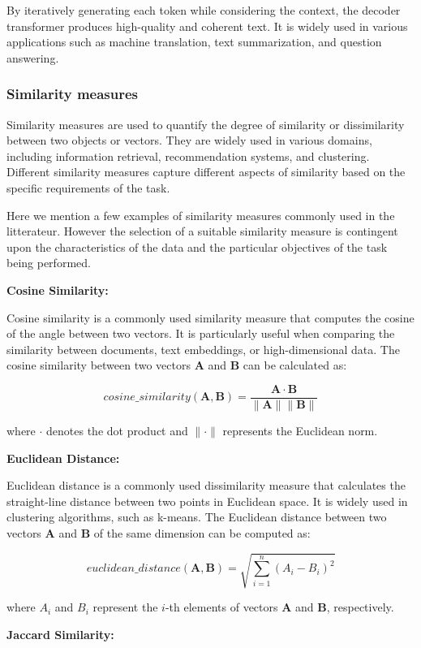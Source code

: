 \documentclass[a4paper,12pt]{article}
\begin{document}
By iteratively generating each token while considering the context, the decoder transformer produces high-quality and coherent text. 
It is widely used in various applications such as machine translation, text summarization, and question answering.

\subsubsection{Similarity measures}
Similarity measures are used to quantify the degree of similarity or dissimilarity between two objects or vectors. They are widely used in various domains, including information retrieval, recommendation systems, and clustering. Different similarity measures capture different aspects of similarity based on the specific requirements of the task.

Here we mention a few examples of similarity measures commonly used in the litterateur. However the selection of a suitable similarity measure is contingent upon the characteristics of the data and the particular objectives of the task being performed.


\textbf{Cosine Similarity:}

Cosine similarity is a commonly used similarity measure that computes the cosine of the angle between two vectors. It is particularly useful when comparing the similarity between documents, text embeddings, or high-dimensional data. The cosine similarity between two vectors $\mathbf{A}$ and $\mathbf{B}$ can be calculated as:

$$cosine\_similarity(\mathbf{A}, \mathbf{B}) = \frac{\mathbf{A} \cdot \mathbf{B}}{\|\mathbf{A}\| \|\mathbf{B}\|}$$

where $\cdot$ denotes the dot product and $\|\cdot\|$ represents the Euclidean norm.

\textbf{Euclidean Distance:}

Euclidean distance is a commonly used dissimilarity measure that calculates the straight-line distance between two points in Euclidean space. It is widely used in clustering algorithms, such as k-means. The Euclidean distance between two vectors $\mathbf{A}$ and $\mathbf{B}$ of the same dimension can be computed as:

$$
euclidean\_distance(\mathbf{A}, \mathbf{B}) = \sqrt{\sum_{i=1}^{n} (A_i - B_i)^2}
$$

where $A_i$ and $B_i$ represent the $i$-th elements of vectors $\mathbf{A}$ and $\mathbf{B}$, respectively.

\textbf{Jaccard Similarity:}
\end{document}
